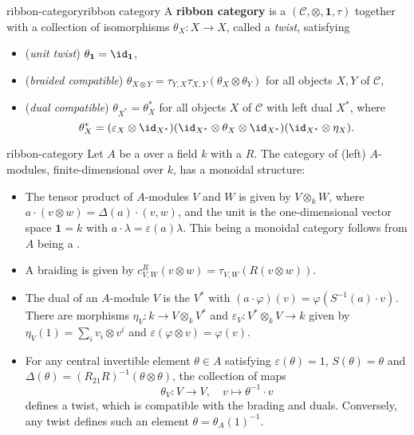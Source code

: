 \begin{topic}{ribbon-category}{ribbon category}
    A \textbf{ribbon category} is a   $(\mathcal{C}, \otimes, \textbf{1}, \tau)$ together with a collection of isomorphisms $\theta_X : X \to X$, called a \textit{twist}, satisfying
    \begin{itemize}
        \item (\textit{unit twist}) $\theta_\textbf{1} = \id_\textbf{1}$,
        \item (\textit{braided compatible}) $\theta_{X \otimes Y} = \tau_{Y, X} \tau_{X, Y} (\theta_X \otimes \theta_Y)$ for all objects $X, Y$ of $\mathcal{C}$,
        \item (\textit{dual compatible}) $\theta_{X^*} = \theta_X^*$ for all objects $X$ of $\mathcal{C}$ with left dual $X^*$, where
        \[ \theta_X^* = (\varepsilon_X \otimes \id_{X^*}) (\id_{X^*} \otimes \theta_X \otimes \id_{X^*}) (\id_{X^*} \otimes \eta_X) . \]
    \end{itemize}
\end{topic}

\begin{example}{ribbon-category}
    Let $A$ be a  over a field $k$ with a  $R$. The category of (left) $A$-modules, finite-dimensional over $k$, has a monoidal structure:
    \begin{itemize}
        \item The tensor product of $A$-modules $V$ and $W$ is given by $V \otimes_k W$, where $a \cdot (v \otimes w) = \Delta(a) \cdot (v, w)$, and the unit is the one-dimensional vector space $\textbf{1} = k$ with $a \cdot \lambda = \varepsilon(a) \lambda$. This being a monoidal category follows from $A$ being a .
        \item A braiding is given by $c_{V, W}^R(v \otimes w) = \tau_{V, W}(R (v \otimes w))$.
        \item The dual of an $A$-module $V$ is the  $V^*$ with $(a \cdot \varphi)(v) = \varphi(S^{-1}(a) \cdot v)$. There are morphisms $\eta_V : k \to V \otimes_k V^*$ and $\varepsilon_V : V^* \otimes_k V \to k$ given by $\eta_V(1) = \sum_i v_i \otimes v^i$ and $\varepsilon(\varphi \otimes v) = \varphi(v)$. 
        \item For any central invertible element $\theta \in A$ satisfying $\varepsilon(\theta) = 1$, $S(\theta) = \theta$ and $\Delta(\theta) = (R_{21} R)^{-1} (\theta \otimes \theta)$, the collection of maps
        \[ \theta_V : V \to V, \quad v \mapsto \theta^{-1} \cdot v \]
        defines a twist, which is compatible with the brading and duals. Conversely, any twist defines such an element $\theta = \theta_A(1)^{-1}$.
    \end{itemize}
\end{example}

